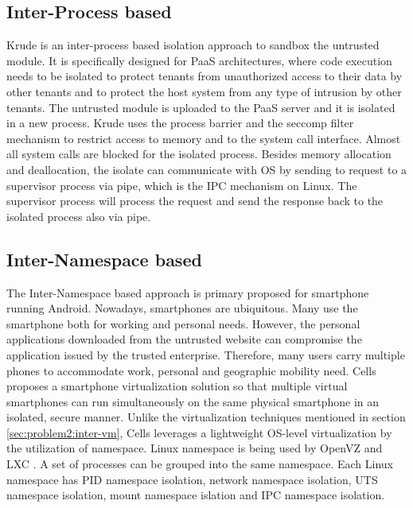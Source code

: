 \subsection{Inter-Process based}
\label{sec:problem2:inter-process}

Krude \etal \cite{Krude} is an inter-process based isolation approach to sandbox
the untrusted module. It is specifically designed for PaaS architectures, where
code execution needs to be isolated to protect tenants from unauthorized access
to their data by other tenants and to protect the host system from any type of
intrusion by other tenants. The untrusted module is uploaded to the PaaS server
and it is isolated in a new process. Krude \etal uses the process barrier and
the seccomp filter mechanism to restrict access to memory and to the system call
interface. Almost all system calls are blocked for the isolated process. Besides
memory allocation and deallocation, the isolate can communicate with OS by
sending to request to a supervisor process via pipe, which is the IPC mechanism
on Linux. The supervisor process will process the request and send the response
back to the isolated process also via pipe.

\subsection{Inter-Namespace based}
\label{sec:problem2:inter-namespace}

The Inter-Namespace based approach is primary proposed for smartphone running
Android. Nowadays, smartphones are ubiquitous. Many use the smartphone both for
working and personal needs. However, the personal applications downloaded from
the untrusted website can compromise the application issued by the trusted
enterprise. Therefore, many users carry multiple phones to accommodate work,
personal and geographic mobility need. Cells proposes a smartphone
virtualization solution so that multiple virtual smartphones can run
simultaneously on the same physical smartphone in an isolated, secure manner.
Unlike the virtualization techniques mentioned in section
\ref{sec:problem2:inter-vm}, Cells leverages a lightweight OS-level
virtualization by the utilization of namespace. Linux namespace is being used by
OpenVZ \cite{openvz} and LXC \cite{lxc}. A set of processes can be grouped into
the same namespace. Each Linux namespace has PID namespace isolation, network
namespace isolation, UTS namespace isolation, mount namespace islation and IPC
namespace isolation.

